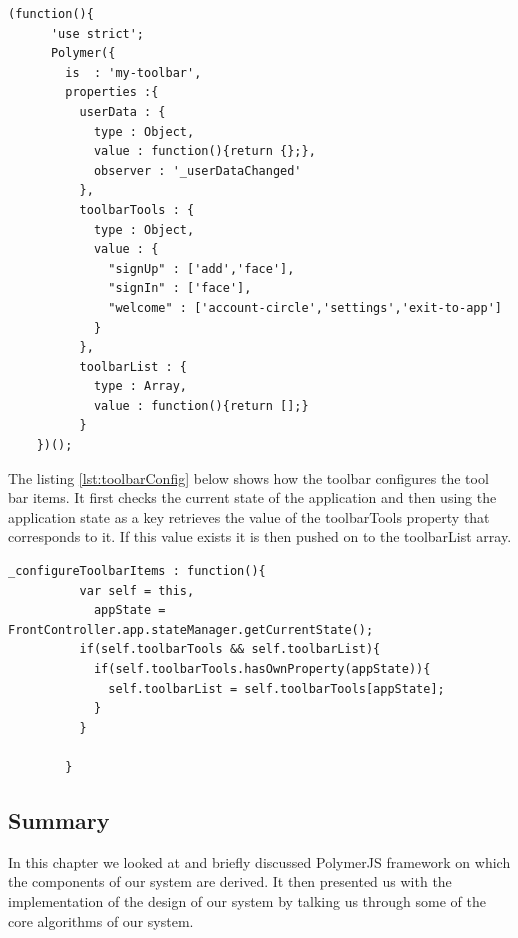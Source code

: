 \begin{lstlisting}[caption={toolbar instance}, label={lst:toolbar}]
 (function(){
      'use strict';
      Polymer({
        is  : 'my-toolbar',
        properties :{
          userData : {
            type : Object,
            value : function(){return {};},
            observer : '_userDataChanged'
          },
          toolbarTools : {
            type : Object,
            value : {
              "signUp" : ['add','face'],
              "signIn" : ['face'],
              "welcome" : ['account-circle','settings','exit-to-app']
            }
          },
          toolbarList : {
            type : Array,
            value : function(){return [];}
          }
    })();
\end{lstlisting}
The listing \ref{lst:toolbarConfig} below shows how the toolbar configures the tool bar items. It first checks the current state of the application and then using the application state as a key retrieves the value of the toolbarTools property that corresponds to it.
If this value exists it is then pushed on to the toolbarList array.
\begin{lstlisting}[caption={Configuring toolbar items}, label={lst:toolbarConfig}]
_configureToolbarItems : function(){
          var self = this,
            appState = FrontController.app.stateManager.getCurrentState();
          if(self.toolbarTools && self.toolbarList){
            if(self.toolbarTools.hasOwnProperty(appState)){
              self.toolbarList = self.toolbarTools[appState];
            }
          }

        }
\end{lstlisting}
\subsection{Summary}
In this chapter we looked at and briefly discussed PolymerJS framework on which the components of our system are derived. It then presented us with the implementation of the design of our system by talking us through some of the core algorithms of our system.


